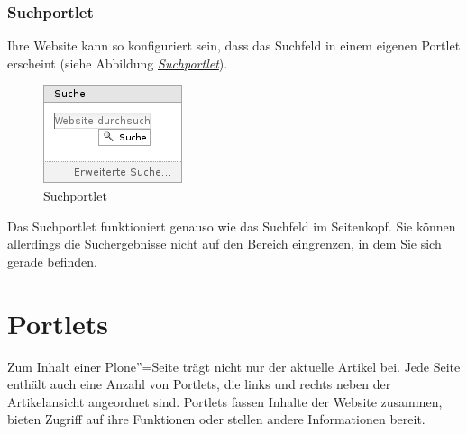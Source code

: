 \documentclass[a4paper,12pt,ngerman]{manual}
\begin{document}
\subsubsection{Suchportlet}

Ihre Website kann so konfiguriert sein, dass das Suchfeld in einem eigenen
Portlet erscheint (siehe Abbildung \hyperlink{fig-portlet-suche}{\emph{Suchportlet}}).
\hypertarget{fig-portlet-suche}{}\begin{figure}[htbp]
\centering

\includegraphics{portlet-suche.png}
\caption{Suchportlet}\end{figure}

Das Suchportlet funktioniert genauso wie das Suchfeld im
Seitenkopf. Sie können allerdings die Suchergebnisse nicht auf den
Bereich eingrenzen, in dem Sie sich gerade befinden.

\resetcurrentobjects
\hypertarget{--doc-oberflaeche/portlets}{}

\hypertarget{sec-portlets}{}\section{Portlets}

Zum Inhalt einer Plone''=Seite trägt nicht nur der aktuelle Artikel
bei. Jede Seite enthält auch eine Anzahl von Portlets, die links und
rechts neben der Artikelansicht angeordnet sind. Portlets fassen
Inhalte der Website zusammen, bieten Zugriff auf ihre Funktionen oder
stellen andere Informationen bereit.
\end{document}
